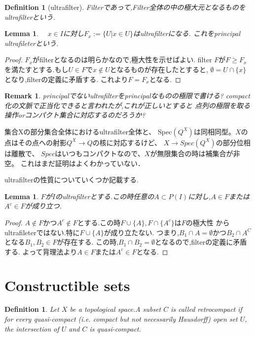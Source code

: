 \documentclass{ujarticle}
\newtheorem{dfn}[thm]{Definition}
\newtheorem{lem}[thm]{Lemma}
\newtheorem*{rem}{Remark}
\begin{document}
\begin{dfn}[ultrafilter]
  Filterであって,Filter全体の中の極大元となるものをultrafilterという.
\end{dfn}

\begin{lem}
　$x \in I$に対し$F_x := \{ U | x \in U\}$はultrafilterになる.
これをprincipal ultrafileterという.
\end{lem}
\begin{proof}
  $F_x$がfilterとなるのは明らかなので,極大性を示せばよい.
  filter $F$が$ F  \ge F_x$を満たすとする.もし$U \in F$で$x \notin U$となるものが存在したとすると,
  $\emptyset = U \cap \{x\}$となり,filterの定義に矛盾する.
  これより$F= F_x$となる.
\end{proof}
\begin{rem}
principalでないultrafilterをprincipalなものの極限で書ける?
compact化の文脈で正当化できると言われたが,これが正しいとすると
点列の極限を取る操作orコンパクト集合に対応するのだろうか?
\end{rem}
集合Xの部分集合全体におけるultrafilter全体と、
Spec$(Q^X)$は同相同型。$X$の点はその点への射影$Q^X→Q$の核に対応するけど、
$X→Spec(Q^X)$の部分位相は離散で、
$Spec$はいつもコンパクトなので、$X$が無限集合の時は補集合が非空。
これはまだ証明はよくわかっていない．



ultrafilterの性質についていくつか記載する.
\begin{lem}
 $F$が$I$のultrafilterとする.この時任意の$A \subset P(I)$に対し,$A \in F$または$A^c \in F$が成り立つ.
\end{lem}
\begin{proof}
 $A \notin F$かつ$A^c \notin F$とする.この時$F \cup \{A\}, F \cap \{A^c\}$は$F$の極大性
 からultrafileterではない.特に$F \cup \{A\}$が成り立たない.
 つまり,$B_1  \cap A = \emptyset$かつ$B_2 \cap A^C$となる$B_1,B_2 \in F$が存在する.
 この時,$B_1 \cap B_2 = \emptyset$となるので,filterの定義に矛盾する.
 よって背理法より$A \in F$または$A^c \in F$となる.
\end{proof}


\section{Constructible sets}
\label{section-constructible}
\begin{dfn}
Let  $X$ be a topological space.A subset $C$ is called retrocompact
if for every quasi-compact (i.e. compact but not necessarily Hausdorff) open set $U$,
the intersection of $U$ and $C$ is quasi-compact.
\end{dfn}
\end{document}
